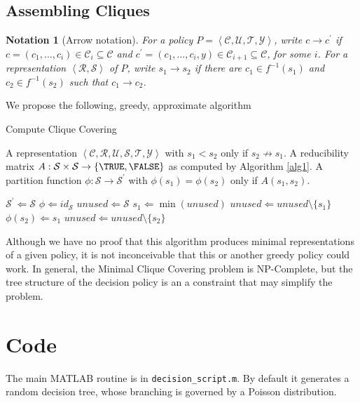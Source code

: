 \documentclass[a4paper,10pt]{article}
\def\1{^{\prime}}
\def\T{\mathcal{T}}
\def\Y{\mathcal{Y}}
\def\C{\mathcal{C}}
\def\U{\mathcal{U}}
\def\R{\mathcal{R}}
\def\S{\mathcal{S}}
\def\ang#1{\left\langle#1\right\rangle}
\def\andn{\setminus}
\def\inv{^{-1}}
\newtheorem{notation}{Notation}
\begin{document}
\subsection{Assembling Cliques}
\begin{notation}[Arrow notation]
For a policy $P=\ang{\C,\U,\T,\Y}$, 
write $c\to c\1$ if $c=(c_1,\ldots,c_i)\in\C_i\subseteq\C$ and 
$c\1=(c_1,\ldots,c_i,y)\in\C_{i+1}\subseteq\C$, for some $i$.  For a representation $\ang{\R,\S}$ of $P$,
write $s_1\to s_2$ if there are $c_1\in f\inv(s_1)$ and $c_2\in f\inv(s_2)$ such that $c_1\to c_2$.
\end{notation}
We propose the following, greedy, approximate algorithm
\begin{algorithm}                      %
\caption{Compute Clique Covering}          %
\label{alg2}                           %
\begin{algorithmic}                    %
  \REQUIRE A representation $\ang{\C,\R,\U,\S,\T,\Y}$ with $s_1<s_2$ only if $s_2\not\to s_1$.
  \REQUIRE A reducibility matrix $A:\S\times\S\to\{\TRUE,\FALSE\}$ as computed by Algorithm \ref{alg1}.
  \ENSURE A partition function $\phi:\S\to\S\1$ with $\phi(s_1)=\phi(s_2)$ only if $A(s_1,s_2)$.
  \bigskip
  
  \STATE $\S\1\Leftarrow\S$
  \STATE $\phi\Leftarrow id_{\S}$
  \STATE $unused\Leftarrow\S$
	\STATE $s_1\Leftarrow\min(unused)$
	\STATE $unused\Leftarrow unused\andn\{s_1\}$
		\STATE $\phi(s_2)\Leftarrow s_1$
		\STATE $unused\Leftarrow unused\andn\{s_2\}$
	  \ENDIF
	\ENDFOR
  \ENDWHILE
\end{algorithmic}
\end{algorithm}
Although we have no proof that this algorithm produces minimal representations
of a given policy, it is not inconceivable that this or another greedy policy could work.
In general, the Minimal Clique Covering problem is NP-Complete, 
but the tree structure of the decision policy is an a constraint that may simplify the problem.
\FloatBarrier

\section{Code}
The main MATLAB routine is in \texttt{decision\_script.m}.   
By default it generates a random decision tree, 
whose branching is governed by a Poisson distribution.
\end{document}
